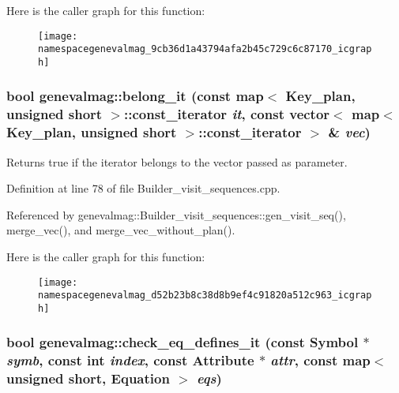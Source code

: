 Here is the caller graph for this function:\nopagebreak
\begin{figure}[H]
\begin{center}
\leavevmode
\texttt{[image: namespacegenevalmag\_9cb36d1a43794afa2b45c729c6c87170\_icgraph]}
\end{center}
\end{figure}
\hypertarget{namespacegenevalmag_d52b23b8c38d8b9ef4c91820a512c963}{
\subsubsection[{belong\_\-it}]{\setlength{\rightskip}{0pt plus 5cm}bool genevalmag::belong\_\-it (const map$<$ {\bf Key\_\-plan}, unsigned short $>$::const\_\-iterator {\em it}, \/  const vector$<$ map$<$ {\bf Key\_\-plan}, unsigned short $>$::const\_\-iterator $>$ \& {\em vec})}}
\label{namespacegenevalmag_d52b23b8c38d8b9ef4c91820a512c963}


Returns true if the iterator belongs to the vector passed as parameter. 

Definition at line 78 of file Builder\_\-visit\_\-sequences.cpp.

Referenced by genevalmag::Builder\_\-visit\_\-sequences::gen\_\-visit\_\-seq(), merge\_\-vec(), and merge\_\-vec\_\-without\_\-plan().

Here is the caller graph for this function:\nopagebreak
\begin{figure}[H]
\begin{center}
\leavevmode
\texttt{[image: namespacegenevalmag\_d52b23b8c38d8b9ef4c91820a512c963\_icgraph]}
\end{center}
\end{figure}
\hypertarget{namespacegenevalmag_d0ec9b7706a340d2e674f3b4859afa2d}{
\subsubsection[{check\_\-eq\_\-defines\_\-it}]{\setlength{\rightskip}{0pt plus 5cm}bool genevalmag::check\_\-eq\_\-defines\_\-it (const Symbol $\ast$ {\em symb}, \/  const int {\em index}, \/  const Attribute $\ast$ {\em attr}, \/  const map$<$ unsigned short, Equation $>$ {\em eqs})}}
\label{namespacegenevalmag_d0ec9b7706a340d2e674f3b4859afa2d}


